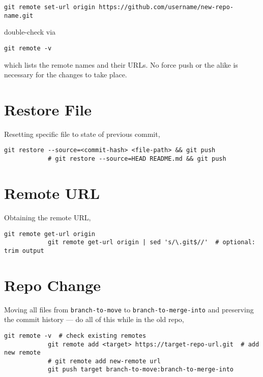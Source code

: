 \documentclass[12pt, a4paper]{scrbook}
\numberwithin{equation}{section}
\theoremstyle{definition}
\theoremstyle{definition}
\begin{document}
		\begin{lstlisting}[style=mystylebash, label=alg:git__rename_repo, xleftmargin=\parindent]
			git remote set-url origin https://github.com/username/new-repo-name.git 
		\end{lstlisting}		
		double-check via
		\begin{lstlisting}[style=mystylebash, label=alg:git__check_remote_url, xleftmargin=\parindent]
			git remote -v
		\end{lstlisting}
		which lists the remote names and their URLs. No force push or the alike is necessary for the changes to take place.		

	\section{Restore File}
	
		Resetting specific file to state of previous commit,
		
		\begin{lstlisting}[style=mystylebash, label=alg:git_restore, xleftmargin=\parindent]
			git restore --source=<commit-hash> <file-path> && git push
			# git restore --source=HEAD README.md && git push
		\end{lstlisting}
	
	\section{Remote URL}
		Obtaining the remote URL, 
		
		\begin{lstlisting}[style=mystylebash, label=alg:git__remote_url, xleftmargin=\parindent]
			git remote get-url origin 
			git remote get-url origin | sed 's/\.git$//'  # optional: trim output
		\end{lstlisting}
		
	\section{Repo Change}
		Moving all files from \texttt{branch-to-move} to \texttt{branch-to-merge-into} and preserving the commit history --- do all of this while in the old repo,
		
		\begin{lstlisting}[style=mystylebash, xleftmargin=\parindent]
			git remote -v  # check existing remotes
			git remote add <target> https://target-repo-url.git  # add new remote
			# git remote add new-remote url
			git push target branch-to-move:branch-to-merge-into 
		\end{lstlisting}
	
\end{document}
